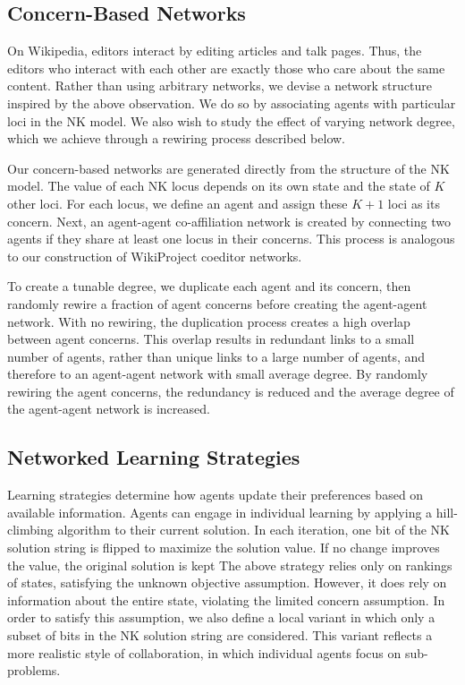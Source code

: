\subsection{Concern-Based Networks}

On Wikipedia, editors interact by editing articles and talk pages.
Thus, the editors who interact with each other are exactly those who care about the same content.
Rather than using arbitrary networks,
we devise a network structure inspired by the above observation.
We do so by associating agents with particular loci in the NK model.
We also wish to study the effect of varying network degree,
which we achieve through a rewiring process described below.

Our concern-based networks are generated directly from the structure of the NK model.
The value of each NK locus depends on its own state and the state of $K$ other loci.
For each locus, we define an agent and assign these $K+1$ loci as its concern.
Next, an agent-agent co-affiliation network is created by connecting two agents if they share at least
one locus in their concerns.
This process is analogous to our construction of WikiProject coeditor networks.

To create a tunable degree, we duplicate each agent and its concern,
then randomly rewire a fraction of agent concerns before creating the agent-agent network.
With no rewiring, the duplication process creates a high overlap between agent concerns.
This overlap results in redundant links to a small number of agents,
rather than unique links to a large number of agents,
and therefore to an agent-agent network with small average degree.
By randomly rewiring the agent concerns, the redundancy is reduced
and the average degree of the agent-agent network is increased.

\subsection{Networked Learning Strategies}

Learning strategies determine how agents update their preferences based on
available information.
Agents can engage in individual learning \cite{barkoczi_social_2016}
by applying a hill-climbing algorithm to their current solution.
In each iteration, one bit of the NK solution string is flipped to maximize the solution value.
If no change improves the value, the original solution is kept
The above strategy relies only on rankings of states,
satisfying the unknown objective assumption.
However, it does rely on information about the entire state,
violating the limited concern assumption.
In order to satisfy this assumption,
we also define a local variant
in which only a subset of bits in the NK solution string are considered.
This variant reflects a more realistic style of collaboration,
in which individual agents focus on sub-problems.

